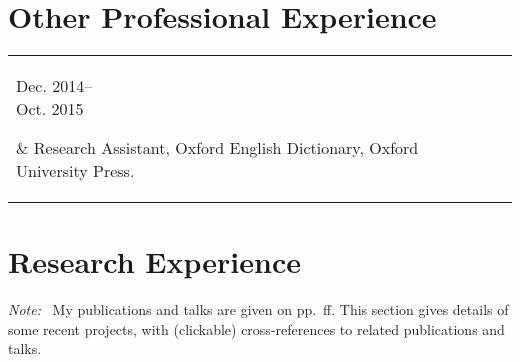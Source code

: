 \documentclass[11pt,a4paper]{article}
\makeatletter
\newcommand{\datewidth}{0.15}
\newenvironment{cvsection}{%
  \setlength{\extrarowheight}{0.70ex}
  \begin{longtable}[l]{@{} L R @{}}
}{%
  \end{longtable}
}
\newcommand{\note}{\emph{Note: }}
\newcommand{\longdate}[1]{\parbox[t]{\datewidth\textwidth}{\raggedleft
#1}}
\makeatother
\begin{document}

\section*{Other Professional Experience}

\begin{cvsection}
  \longdate{Dec. 2014--\\[-0.5em] Oct. 2015}
  & Research Assistant, Oxford English Dictionary, Oxford University Press.\\
\end{cvsection}

\newpage

\section*{Research Experience}

\note\ My publications and talks are given on pp.~\pageref{scholarship}ff. This section gives details of some recent projects, with (clickable) cross-references to related publications and talks.\\
\end{document}
